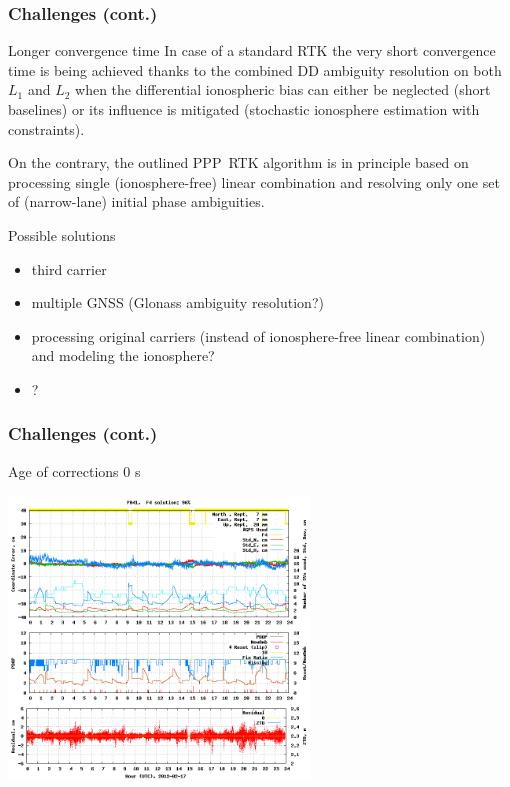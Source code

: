 \documentclass[10pt]{beamer}
\begin{document}
\begin{frame}
  \frametitle{Challenges (cont.)}
  \begin{block}{Longer convergence time}
  In case of a standard RTK the very short convergence time is being achieved
  thanks to the combined DD ambiguity resolution on both $L_1$ and $L_2$ when
  the differential ionospheric bias can either be neglected (short baselines)
  or its influence is mitigated (stochastic ionosphere estimation with
  constraints).

  On the contrary, the outlined PPP~RTK algorithm is in principle based on
  processing single (ionosphere-free) linear combination and resolving only
  one set of (narrow-lane) initial phase ambiguities.
  \end{block}
  \begin{block}{Possible solutions}
  \begin{itemize}
  \item third carrier
  \item multiple GNSS (Glonass ambiguity resolution?)
  \item processing original carriers (instead of ionosphere-free linear
    combination) and modeling the ionosphere?
  \item ?
  \end{itemize}
  \end{block}
\end{frame}


\begin{frame}
  \frametitle{Challenges (cont.)}
  \begin{block}{Age of corrections 0 s}
  \begin{center}
    \includegraphics[width=0.6\textwidth]{age1.png}
  \end{center}
  \end{block}
\end{frame}
\end{document}
